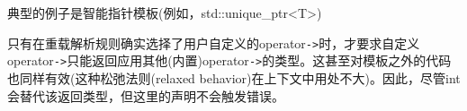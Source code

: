 \begin{tcolorbox}[colback=webgreen!5!white,colframe=webgreen!75!black]
\hspace*{0.75cm}典型的例子是智能指针模板(例如，std::unique\_ptr<T>)
\end{tcolorbox}

只有在重载解析规则确实选择了用户自定义的operator\texttt{->}时，才要求自定义operator\texttt{->}只能返回应用其他(内置)operator\texttt{->}的类型。这甚至对模板之外的代码也同样有效(这种松弛法则(relaxed behavior)在上下文中用处不大)。因此，尽管int会替代该返回类型，但这里的声明不会触发错误。






































